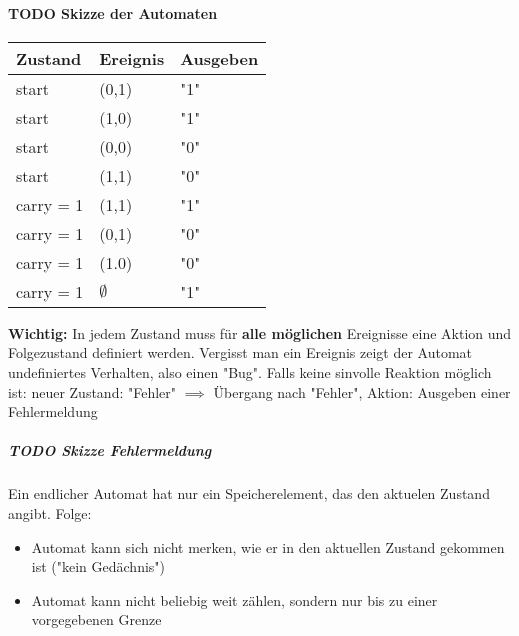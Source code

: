 \documentclass[a4paper]{scrartcl}
\theoremstyle{definition}
\theoremstyle{plain}
\theoremstyle{remark}
\theoremstyle{remark}
\begin{document}
\paragraph{{\bfseries\sffamily TODO} Skizze der Automaten}
\label{sec-3-3-3-2}
\begin{center}
\begin{tabular}{lll}
Zustand & Ereignis & Ausgeben\\
\hline
start & (0,1) & "1"\\
start & (1,0) & "1"\\
start & (0,0) & "0"\\
start & (1,1) & "0"\\
carry = 1 & (1,1) & "1"\\
carry = 1 & (0,1) & "0"\\
carry = 1 & (1.0) & "0"\\
carry = 1 & $\emptyset$ & "1"\\
\end{tabular}
\end{center}
\textbf{Wichtig:} In jedem Zustand muss für \textbf{alle möglichen} Ereignisse eine Aktion und Folgezustand definiert werden.
Vergisst man ein Ereignis zeigt der Automat undefiniertes Verhalten, also einen "Bug".
Falls keine sinvolle Reaktion möglich ist: neuer Zustand: "Fehler" $\implies$ Übergang nach "Fehler",
Aktion: Ausgeben einer Fehlermeldung
\subparagraph{{\bfseries\sffamily TODO} Skizze Fehlermeldung}
\label{sec-3-3-3-2-1}
Ein endlicher Automat hat nur ein Speicherelement, das den aktuelen Zustand angibt. Folge:
\begin{itemize}
\item Automat kann sich nicht merken, wie er in den aktuellen Zustand gekommen ist ("kein Gedächnis")
\item Automat kann nicht beliebig weit zählen, sondern nur bis zu einer vorgegebenen Grenze
\end{itemize}
\begin{center}
\end{center}
\end{document}

